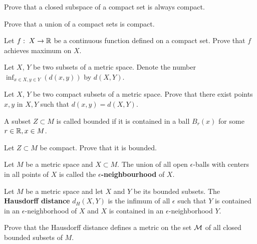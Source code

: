 \documentclass[12pt]{article}
\begin{document}
\begin{zadacha} Prove that a closed subspace of a compact set is
  always compact.
\end{zadacha}

\begin{zadacha} Prove that a union of a compact sets is compact.
\end{zadacha}

\begin{zadacha}[!] Let $f:\; X \to {\mathbb R}$ be a continuous function
defined on a compact set. Prove that $f$ achieves maximum on $X$.
\end{zadacha}

\begin{opredelenie} Let $X$, $Y$ be two subsets
of a metric space. Denote the number $\inf_{x\in X, y \in
  Y}(d(x,y))$ by $d(X, Y)$.
\end{opredelenie}

\begin{zadacha}[!] Let $X$, $Y$ be two compact subsets of a metric
  space. Prove that there exist points $x, y$ in $X, Y$ such that 
 $d(x,y) = d(X,Y)$.
\end{zadacha}

\begin{opredelenie} A subset $Z\subset M$ is called bounded
if it is contained in a ball $B_r(x)$ for some 
$r\in{\mathbb R}, x\in M$.
\end{opredelenie}

\begin{zadacha} Let $Z\subset M$ be compact.
Prove that it is bounded.
\end{zadacha}

\begin{opredelenie} Let $M$ be a metric space and $X\subset M$. The 
  union of all open $\epsilon$-balls with centers in all points of $X$ is
  called the {\bf $\epsilon$-neighbourhood} of $X$.
\end{opredelenie}

\begin{opredelenie} Let $M$ be a metric space and let $X$ and $Y$ be
  its bounded subsets. The {\bf Hausdorff distance} $d_{H}(X,Y)$ is the 
  infimum of all $\epsilon$ such that $Y$ is contained in an
  $\epsilon$-neighborhood of $X$ and $X$ is contained in an
  $\epsilon$-neighborhood $Y$.
\end{opredelenie}

\begin{zadacha}[!] Prove that the Hausdorff distance defines a metric on
  the set $\cal M$ of all closed bounded subsets of $M$.
\end{zadacha}
\end{document}
